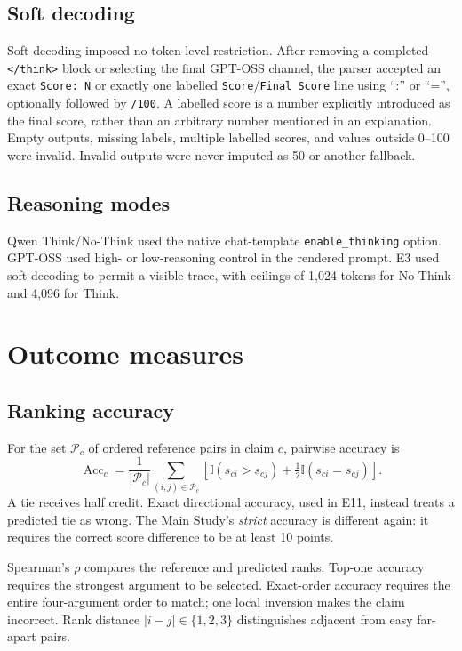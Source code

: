 \documentclass[11pt,twoside,a4paper]{report}
\newcommand{\ind}{\mathbb{I}}
\begin{document}
\subsection{Soft decoding}

Soft decoding imposed no token-level restriction.  After removing a completed
\texttt{</think>} block or selecting the final GPT-OSS channel, the parser accepted
an exact \texttt{Score: N} or exactly one labelled \texttt{Score}/\texttt{Final
Score} line using ``:'' or ``='', optionally followed by \texttt{/100}.  A labelled
score is a number explicitly introduced as the final score, rather than an arbitrary
number mentioned in an explanation.  Empty outputs, missing labels, multiple labelled
scores, and values outside 0--100 were invalid.  Invalid outputs were never imputed
as 50 or another fallback.

\subsection{Reasoning modes}

Qwen Think/No-Think used the native chat-template \texttt{enable\_thinking} option.
GPT-OSS used high- or low-reasoning control in the rendered prompt.  E3 used soft
decoding to permit a visible trace, with ceilings of 1,024 tokens for No-Think and
4,096 for Think.

\section{Outcome measures}

\subsection{Ranking accuracy}

For the set $\mathcal P_c$ of ordered reference pairs in claim $c$, pairwise accuracy
is
\begin{equation}
 \operatorname{Acc}_c=\frac{1}{|\mathcal P_c|}
 \sum_{(i,j)\in\mathcal P_c}
 \left[\ind(s_{ci}>s_{cj})+\tfrac12\ind(s_{ci}=s_{cj})\right].
 \label{eq:pair-accuracy}
\end{equation}
A tie receives half credit.  Exact directional accuracy, used in E11, instead treats
a predicted tie as wrong.  The Main Study's \emph{strict} accuracy is different
again: it requires the correct score difference to be at least 10 points.

Spearman's $\rho$ compares the reference and predicted ranks.  Top-one accuracy
requires the strongest argument to be selected.  Exact-order accuracy requires the
entire four-argument order to match; one local inversion makes the claim incorrect.
Rank distance $|i-j|\in\{1,2,3\}$ distinguishes adjacent from easy far-apart pairs.
\end{document}
